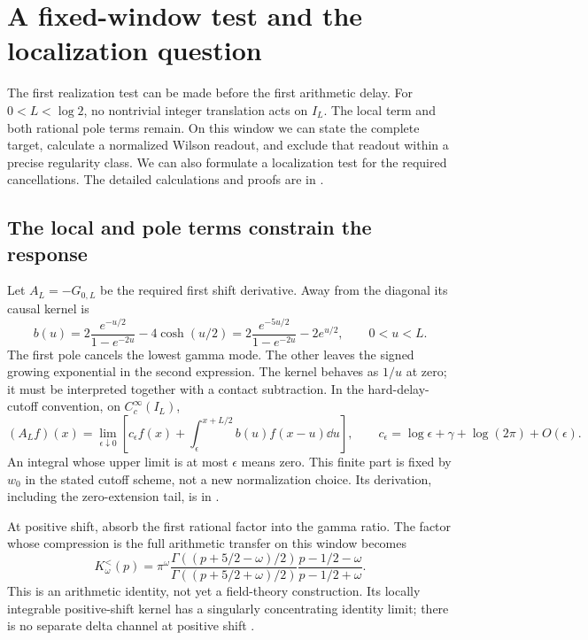 \section{A fixed-window test and the localization question}
\label{sec:fixed-window}

The first realization test can be made before the first arithmetic
delay. For $0<L<\log2$, no nontrivial integer translation acts on
$I_L$. The local term and both rational pole terms remain. On this
window we can state the complete target, calculate a normalized
Wilson readout, and exclude that readout within a precise regularity
class. We can also formulate a localization test for the required
cancellations. The detailed calculations and proofs are in
\cite[Sections~S10--S11]{Supplement}.

\subsection{The local and pole terms constrain the response}

Let $A_L=-G_{0,L}$ be the required first shift derivative. Away
from the diagonal its causal kernel is
\begin{equation}\label{eq:main-required-response}
 b(u)=2\frac{e^{-u/2}}{1-e^{-2u}}-4\cosh(u/2)
     =2\frac{e^{-5u/2}}{1-e^{-2u}}-2e^{u/2},
 \qquad 0<u<L.
\end{equation}
The first pole cancels the lowest gamma mode. The other leaves
the signed growing exponential in the second expression.
The kernel behaves as $1/u$ at zero; it must be interpreted
together with a contact subtraction. In the hard-delay-cutoff
convention, on $C_c^\infty(I_L)$,
\begin{equation}\label{eq:main-contact}
 (A_Lf)(x)=\lim_{\epsilon\downarrow0}
 \left[c_\epsilon f(x)+
 \int_\epsilon^{x+L/2}b(u)f(x-u)\dd u\right],
 \qquad
 c_\epsilon=\log\epsilon+\gamma+\log(2\pi)+O(\epsilon).
\end{equation}
An integral whose upper limit is at most $\epsilon$ means zero.
This finite part is fixed by $w_0$ in the stated cutoff scheme,
not a new normalization choice. Its derivation, including the
zero-extension tail, is in \cite[Section~S10.1]{Supplement}.

At positive shift, absorb the first rational factor into the
gamma ratio. The factor whose compression is the full arithmetic
transfer on this window becomes
\begin{equation}\label{eq:main-small-factor}
 K_\omega^{<}(p)=
 \pi^\omega
 \frac{\Gamma((p+5/2-\omega)/2)}
      {\Gamma((p+5/2+\omega)/2)}
 \frac{p-1/2-\omega}{p-1/2+\omega}.
\end{equation}
This is an arithmetic identity, not yet a field-theory
construction. Its locally integrable positive-shift kernel has
a singularly concentrating identity limit; there is no separate
delta channel at positive shift
\cite[Section~S10.2]{Supplement}.

